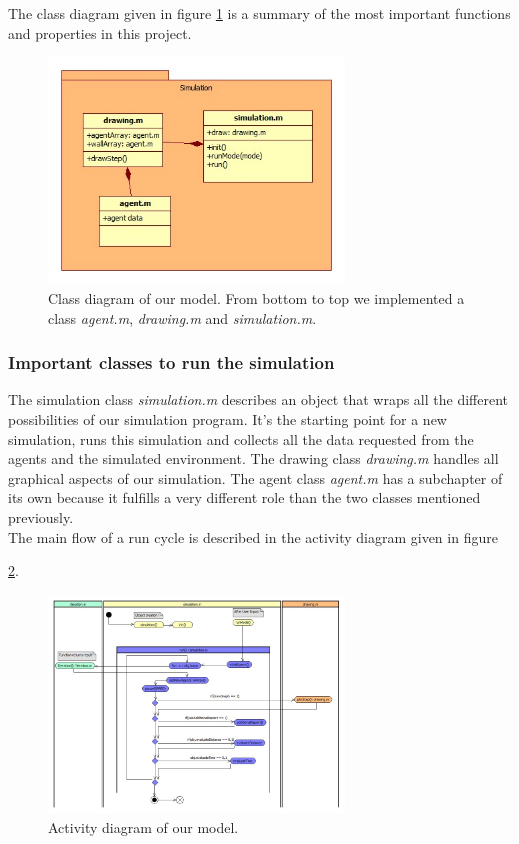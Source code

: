 \noi The class diagram given in figure \ref{fig:classpackage} is a summary of the most important functions and properties in this project.\\

\begin{figure}[h!]
	\centering
		\includegraphics[width=0.70\textwidth]{pictures/classpackage}
	\caption{Class diagram of our model. From bottom to top we implemented a class \textit{agent.m}, \textit{drawing.m} and \textit{simulation.m}.}
	\label{fig:classpackage}
\end{figure}

\subsubsection{Important classes to run the simulation}
\noi The simulation class \textit{simulation.m} describes an object that wraps all the different possibilities of our simulation program. It's the starting point for a new simulation, runs this simulation and collects all the data requested from the agents and the simulated environment. The drawing class \textit{drawing.m} handles all graphical aspects of our simulation. The agent class \textit{agent.m} has a subchapter of its own because it fulfills a very different role than the two classes mentioned previously.\\
The main flow of a run cycle is described in the activity diagram given in figure

\ref{fig:activityDiagram}.\\
\begin{figure}[h!]
	\centering
		\includegraphics[width=0.70\textwidth]{pictures/activityDiagram}
	\caption{Activity diagram of our model.}
	\label{fig:activityDiagram}
\end{figure}

